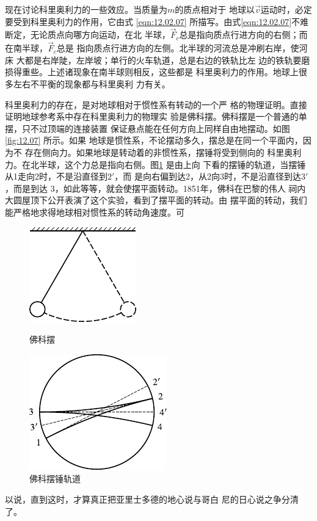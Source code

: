 现在讨论科里奥利力的一些效应。当质量为$ m $的质点相对于
地球以$\vec{v}$运动时，必定要受到科里奥利力的作用，它由式 \eqref{eqn:12.02.07}
所描写。由式\eqref{eqn:12.02.07}不难断定，无论质点向哪方向运动，在北
半球，$ \vec{F}_c $总是指向质点行进方向的右侧；而在南半球，$ \vec{F}_c $总是
指向质点行进方向的左侧。北半球的河流总是冲刷右岸，使河床
大都是右岸陡，左岸坡；单行的火车轨道，总是右边的铁轨比左
边的铁轨要磨损得重些。上述诸现象在南半球则相反，这些都是
科里奥利力的作用。地球上很多左右不平衡的现象都与科里奥利
力有关。

科里奥利力的存在，是对地球相对于惯性系有转动的一个严
格的物理证明。直接证明地球参考系中存在科里奥利力的物理实
验是佛科摆。佛科摆是一个普通的单摆，只不过顶端的连接装置
保证悬点能在任何方向上同样自由地摆动。如图\ref{fig:12.07} 所示。如果
地球是惯性系，不论摆动多久，摆总是在同一个平面内，因为不
存在侧向力。如果地球是转动着的非惯性系，摆锤将受到侧向的
科里奥利力。在北半球，这个力总是指向右侧。图\ref{fig:12.08} 是由上向
下看的摆锤的轨道，当摆锤从1走向2时，不是沿直径到$ 2' $，而
是向右偏到达2，从2向3时，不是沿直径到达$ 3' $，而是到达
3，如此等等，就会使摆平面转动。1851年，佛科在巴黎的伟人
祠内大圆屋顶下公开表演了这个实验，看到了摆平面的转动。由
摆平面的转动，我们能严格地求得地球相对惯性系的转动角速度。可

\begin{figure}[h]
  \begin{minipage}[b]{0.5\linewidth}
    \centering
    \includegraphics{figure/fig12.07}
    \caption{佛科摆}
    \label{fig:12.07}
  \end{minipage}
  \begin{minipage}[b]{0.5\linewidth}
    \centering
    \includegraphics{figure/fig12.08}
    \caption{佛科摆锤轨道}
    \label{fig:12.08}
  \end{minipage}
\end{figure}%
\noindent
以说，直到这时，才算真正把亚里士多德的地心说与哥白
尼的日心说之争分清了。

